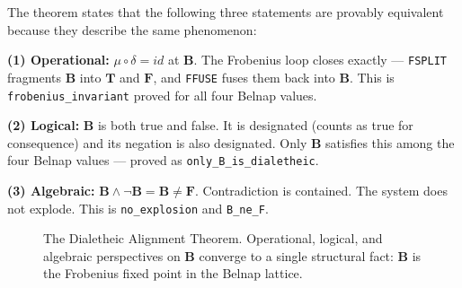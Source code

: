 \documentclass[10pt,a4paper]{article}
\begin{document}
The theorem states that the following three statements are provably equivalent because they describe the same phenomenon:

\textbf{(1) Operational:} $\mu\circ\delta = id$ at $\mathbf{B}$. The Frobenius loop closes exactly --- \texttt{FSPLIT}  fragments $\mathbf{B}$ into $\mathbf{T}$ and $\mathbf{F}$, and \texttt{FFUSE} fuses them back into $\mathbf{B}$. This is \texttt{frobenius\_\allowbreak invariant} proved for all four Belnap values.

\textbf{(2) Logical:} $\mathbf{B}$ is both true and false. It is designated (counts as true for consequence) and its negation is also designated. Only $\mathbf{B}$ satisfies this among the four Belnap values --- proved as \texttt{only\_\allowbreak B\_\allowbreak is\_\allowbreak dialetheic}.

\textbf{(3) Algebraic:} $\mathbf{B} \land \neg \mathbf{B} = \mathbf{B} \neq \mathbf{F}$. Contradiction is contained. The system does not explode. This is \texttt{no\_\allowbreak explosion} and \texttt{B\_\allowbreak ne\_\allowbreak F}.

\begin{figure}[htbp]
\centering
{}
\caption{The Dialetheic Alignment Theorem. Operational, logical, and algebraic
perspectives on $\mathbf{B}$ converge to a single structural fact: $\mathbf{B}$
is the Frobenius fixed point in the Belnap lattice.}
\label{fig:dat}
\end{figure}
\end{document}
